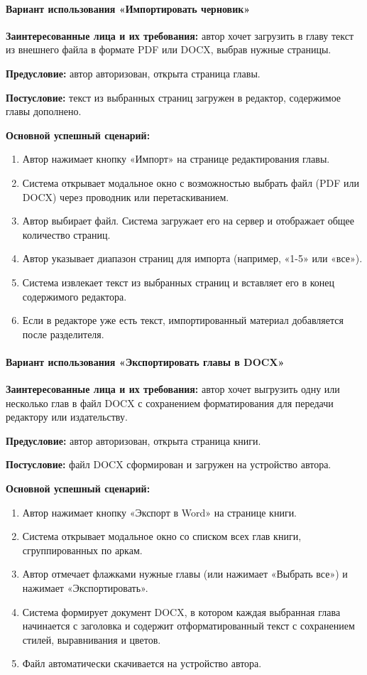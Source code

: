 \paragraph{Вариант использования «Импортировать черновик»}

\textbf{Заинтересованные лица и их требования:} автор хочет загрузить в главу текст из внешнего файла в формате PDF или DOCX, выбрав нужные страницы.

\textbf{Предусловие:} автор авторизован, открыта страница главы.

\textbf{Постусловие:} текст из выбранных страниц загружен в редактор, содержимое главы дополнено.

\textbf{Основной успешный сценарий:}
\begin{enumerate}
    \item Автор нажимает кнопку «Импорт» на странице редактирования главы.
    \item Система открывает модальное окно с возможностью выбрать файл (PDF или DOCX) через проводник или перетаскиванием.
    \item Автор выбирает файл. Система загружает его на сервер и отображает общее количество страниц.
    \item Автор указывает диапазон страниц для импорта (например, «1-5» или «все»).
    \item Система извлекает текст из выбранных страниц и вставляет его в конец содержимого редактора.
    \item Если в редакторе уже есть текст, импортированный материал добавляется после разделителя.
\end{enumerate}

\paragraph{Вариант использования «Экспортировать главы в DOCX»}

\textbf{Заинтересованные лица и их требования:} автор хочет выгрузить одну или несколько глав в файл DOCX с сохранением форматирования для передачи редактору или издательству.

\textbf{Предусловие:} автор авторизован, открыта страница книги.

\textbf{Постусловие:} файл DOCX сформирован и загружен на устройство автора.

\textbf{Основной успешный сценарий:}
\begin{enumerate}
    \item Автор нажимает кнопку «Экспорт в Word» на странице книги.
    \item Система открывает модальное окно со списком всех глав книги, сгруппированных по аркам.
    \item Автор отмечает флажками нужные главы (или нажимает «Выбрать все») и нажимает «Экспортировать».
    \item Система формирует документ DOCX, в котором каждая выбранная глава начинается с заголовка и содержит отформатированный текст с сохранением стилей, выравнивания и цветов.
    \item Файл автоматически скачивается на устройство автора.
\end{enumerate}

